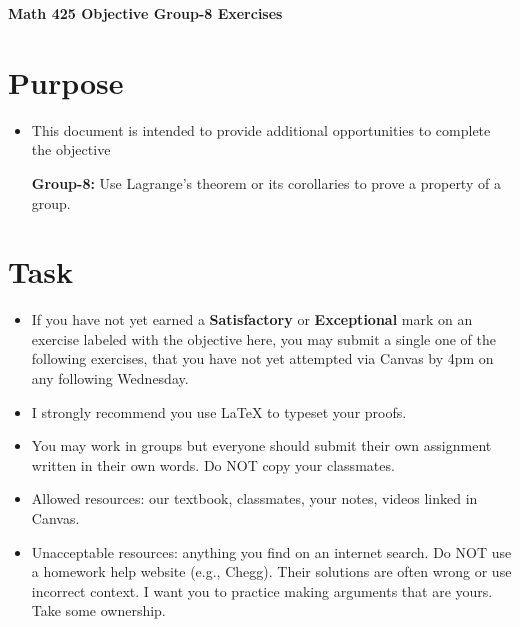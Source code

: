 \documentclass[12pt]{article}
\begin{document}
	\begin{center}
		{\Large \bf Math 425 Objective Group-8 Exercises}
	\end{center}
	\section*{Purpose}
	\begin{itemize}
		\item This document is intended to provide additional opportunities to complete the objective
		
		\textbf{Group-8:}  Use Lagrange’s theorem or its corollaries to prove a property of a group.
	\end{itemize}
	\section*{Task}
	\begin{itemize}
		\item If you have not yet earned a \textbf{Satisfactory} or \textbf{Exceptional} mark on an exercise labeled with the objective here, you may submit a single one of the following exercises, that you have not yet attempted via Canvas by 4pm on any following Wednesday.
		\item I strongly recommend you use LaTeX to typeset your proofs.
		\item You may work in groups but everyone should submit their own assignment written in their own words.  Do NOT copy your classmates.
		\item Allowed resources: our textbook, classmates, your notes, videos linked in Canvas.
		\item Unacceptable resources: anything you find on an internet search. Do NOT use a homework help website (e.g., Chegg). Their solutions are often wrong or use incorrect context.  I want you to practice making arguments that are yours. Take some ownership.
	\end{itemize}
\end{document}
